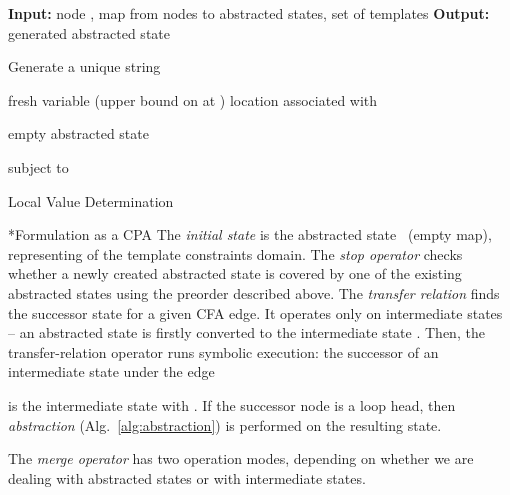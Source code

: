 \documentclass{llncs}
\makeatletter
\newcommand{\cfa}{\textsc{CFA}\xspace}
\renewcommand{\paragraph}{\@startsection{paragraph}{4}{\z@}{0.8ex \@plus 0ex \@minus 1ex}{-1em}{\normalfont\normalsize\bfseries}}
\makeatother
\begin{document}
\begin{algorithm}[t]
\begin{algorithmic}[1]
\State \textbf{Input: } node , map  from nodes to abstracted states,
set  of templates
\State \textbf{Output: } generated abstracted state 
\State 

\ForAll{}
    \State 
    \ForAll{}
        \State 
        \State Generate a unique string 

        \State 
        \State  fresh variable (upper bound on  at )
        \State 
                \label{alg:value_determination:output_constraint}
        \State  location associated with 
        \ForAll{}
            \State 
                \label{alg:value_determination:input_constraint}
        \EndFor
    \EndFor
\EndFor

\State  empty abstracted state

    \State 
    \State  subject to 
        \label{alg:value_determination:maximization}
    \State 
        \label{alg:value_determination:record}
\EndFor

\Return 
\end{algorithmic}
\caption{Local Value Determination}
\label{alg:value_determination}
\end{algorithm}

\paragraph*{Formulation as a CPA}
The \emph{initial state} is the abstracted state~ (empty map),
representing  of the template constraints domain.
The \emph{stop operator} checks whether a newly created abstracted state
is covered by one of the existing abstracted states using the preorder described above.
The \emph{transfer relation} finds the successor state for a given \cfa edge.
It operates only on intermediate states -- an abstracted
state  is firstly converted to the intermediate state .
Then, the transfer-relation operator runs symbolic execution:
the successor of an intermediate state  under the edge

is the intermediate state  with .
If the successor node is a loop head, then \emph{abstraction}
(Alg.~\ref{alg:abstraction}) is performed on the resulting state.

The \emph{merge operator} has two operation
modes, depending on whether we are dealing with abstracted states or with
intermediate states.
\end{document}
